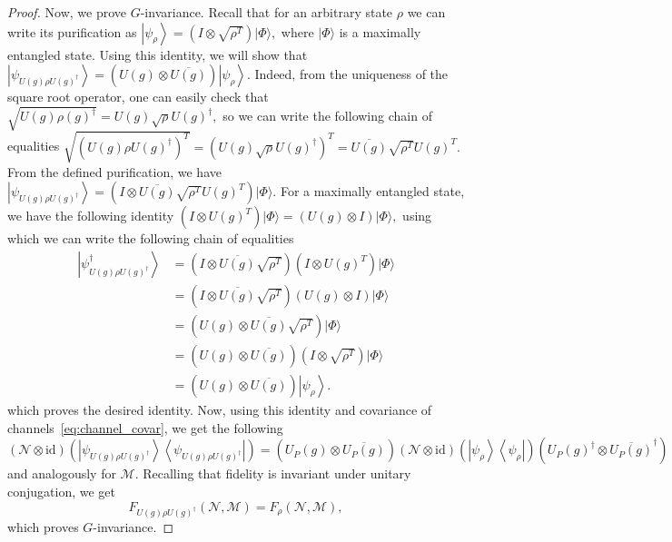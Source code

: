 \documentclass[10pt,twocolumn,superscriptaddress,aps,amsmath,amssymb,citeautoscript,floatfix,prx]{revtex4-2}
\theoremstyle{plain}
\theoremstyle{plain}
\theoremstyle{plain}
\theoremstyle{plain}
\theoremstyle{plain}
\theoremstyle{plain}
\theoremstyle{plain}
\theoremstyle{definition}
\theoremstyle{plain}
\begin{document}
\begin{appendix}
\begin{proof}
    Now, we prove $G$-invariance. Recall that for an arbitrary state $\rho$ we can write its purification as
    $
        \left|\psi_\rho\right\rangle=\left(I \otimes \sqrt{\rho^T}\right)|\Phi\rangle,
    $
    where $|\Phi\rangle$ is a maximally entangled state. Using this identity, we will show that
    $
        \left|\psi_{U(g) \rho U(g)^{\dagger}}\right\rangle=\left(U(g) \otimes \overline{U(g)}\right)\left|\psi_\rho\right\rangle.
    $
    Indeed, from the uniqueness of the square root operator, one can easily check that
    $
        \sqrt{U(g) \rho (g)^{\dagger}}=U(g) \sqrt{\rho} U(g)^{\dagger},
    $
    so we can write the following chain of equalities
    $
        \sqrt{\left(U(g) \rho U(g)^{\dagger}\right)^T}=\left(U(g) \sqrt{\rho} U(g)^{\dagger}\right)^T=\overline{U(g)} \sqrt{\rho^T} U(g)^T.
    $
    From the defined purification, we have
    $
        \left|\psi_{U(g) \rho U(g)^{\dagger}}\right\rangle=\left(I \otimes \overline{U(g)} \sqrt{\rho^T} U(g)^T\right)|\Phi\rangle.
    $
    For a maximally entangled state, we have the following identity
    $
        \left(I \otimes U(g)^T\right)|\Phi\rangle=\left(U(g) \otimes I\right)|\Phi\rangle,
    $
    using which we can write the following chain of equalities
    \[
        \begin{aligned}
        \left|\psi_{U(g) \rho U(g)^{\dagger}}^{\dagger}\right\rangle & =\left(I \otimes \overline{U(g)} \sqrt{\rho^T}\right)\left(I \otimes U(g)^T\right)|\Phi\rangle \\
        & =\left(I \otimes \overline{U(g)} \sqrt{\rho^T}\right)\left(U(g) \otimes I\right)|\Phi\rangle \\
        & =\left(U(g) \otimes \overline{U(g)} \sqrt{\rho^T}\right)|\Phi\rangle \\
        & =\left(U(g) \otimes \overline{U(g)}\right)\left(I \otimes \sqrt{\rho^T}\right)|\Phi\rangle \\
        & =\left(U(g) \otimes \overline{U(g)}\right)\left|\psi_\rho\right\rangle .
        \end{aligned}
    \]
    which proves the desired identity. Now, using this identity and covariance of channels~\eqref{eq:channel_covar}, we get the following
    \[
        (\mathcal{N} \otimes \mathrm{id})\left(\left|\psi_{U(g) \rho U(g)^{\dagger}}\right\rangle\left\langle\psi_{U(g) \rho U(g)^{\dagger}}\right|\right)=\left(U_P(g) \otimes \overline{U_P(g)}\right)(\mathcal{N} \otimes \mathrm{id})\left(\left|\psi_\rho\right\rangle\left\langle\psi_\rho\right|\right)\left(U_P(g)^{\dagger} \otimes \overline{U_P(g)}^{\dagger}\right)
    \]
    and analogously for $\mathcal{M}$. Recalling that fidelity is invariant under unitary conjugation, we get
    \[
        F_{U(g) \rho U(g)^{\dagger}}(\mathcal{N}, \mathcal{M})=F_\rho(\mathcal{N}, \mathcal{M}),
    \]
    which proves $G$-invariance. 


\end{proof}
\end{appendix}
\end{document}
